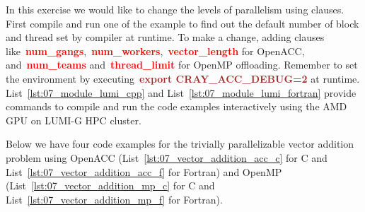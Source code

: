 \par
In this exercise we would like to change the levels of parallelism using clauses.
First compile and run one of the example to find out the default number of block and thread set by compiler at runtime.
To make a change, adding clauses like~\textbf{\textcolor{red}{num\_gangs}},~\textbf{\textcolor{red}{num\_workers}},~\textbf{\textcolor{red}{vector\_length}} for OpenACC, and~\textbf{\textcolor{red}{num\_teams}} and~\textbf{\textcolor{red}{thread\_limit}} for OpenMP offloading.
Remember to set the environment by executing~\textbf{\textcolor{brown}{export CRAY\_ACC\_DEBUG=2}} at runtime.
List~\ref{lst:07_module_lumi_cpp} and List~\ref{lst:07_module_lumi_fortran} provide commands to compile and run the code examples interactively using the AMD GPU on LUMI-G HPC cluster.








\par
Below we have four code examples for the trivially parallelizable vector addition problem using OpenACC (List~\ref{lst:07_vector_addition_acc_c} for C and List~\ref{lst:07_vector_addition_acc_f} for Fortran) and OpenMP (List~\ref{lst:07_vector_addition_mp_c} for C and List~\ref{lst:07_vector_addition_mp_f} for Fortran).








